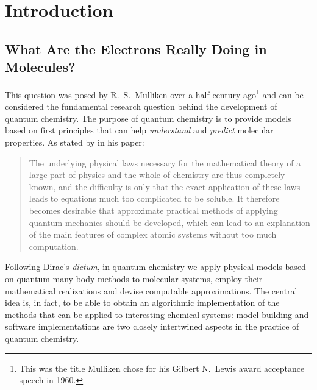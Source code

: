 \chapter*{Introduction}

\renewcommand{\thefigure}{\Alph{figure}}

\begin{epigraphs}
\setlength\epigraphwidth{7.5cm}
\setlength\epigraphwidth{7cm}
\end{epigraphs}


\section*{What Are the Electrons Really Doing in Molecules?}

This question was posed by R.~S.~Mulliken over a half-century
ago\footnote{This was the title Mulliken chose for his Gilbert N.~Lewis
award acceptance speech in 1960.}
and can be considered the fundamental research question behind the
development of quantum chemistry.
The purpose of quantum chemistry is to provide models based on first
principles that can help \emph{understand} and \emph{predict} molecular properties.
As stated by \citeauthor{Dirac1929-gn} in his 
paper:\autocite{Dirac1929-gn, Kutzelnigg2000-fl}
\blockquote{The underlying physical laws necessary for the mathematical
theory of a large part of physics and the whole of chemistry are thus
completely known, and the difficulty is only that the exact application of
these laws leads to equations much too complicated to be soluble. It
therefore becomes desirable that approximate practical methods of
applying quantum mechanics should be developed, which can lead to an
explanation of the main features of complex atomic systems without too
much computation.}
Following Dirac's \emph{dictum}, in quantum chemistry we apply physical
models based on quantum many-body methods to molecular systems, employ
their mathematical realizations and devise computable approximations.
The central idea is, in fact, to be able to obtain an algorithmic
implementation of the methods that can be applied to interesting
chemical systems: model building and software implementations are two
closely intertwined aspects in the practice of quantum chemistry.

